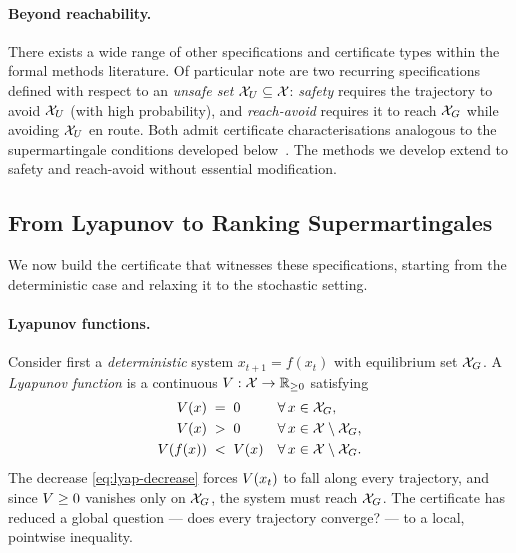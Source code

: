\paragraph{Beyond reachability.} There exists a wide range of other specifications and certificate types
within the formal methods literature. Of particular note are two recurring specifications defined with respect to an \emph{unsafe set} $\mathcal{X}_U \subseteq \mathcal{X}$:
\textit{safety} requires the trajectory to avoid $\mathcal{X}_U$ (with high probability),
and \textit{reach-avoid} requires it to reach $\mathcal{X}_G$ while avoiding $\mathcal{X}_U$ en
route. Both admit certificate characterisations analogous to the supermartingale
conditions developed below~\cite{zikelic2023reachavoid}. The methods we develop extend to safety and
reach-avoid without essential modification.

\subsection{From Lyapunov to Ranking Supermartingales}
\label{subsec:supermartingales}

We now build the certificate that witnesses these specifications, starting from
the deterministic case and relaxing it to the stochastic setting.

\paragraph{Lyapunov functions.} Consider first a \emph{deterministic} system
$x_{t+1} = f(x_t)$ with equilibrium set $\mathcal{X}_G$. A \textit{Lyapunov function} is
a continuous $V : \mathcal{X} \to \mathbb{R}_{\geq 0}$ satisfying
%
\begin{align}
    V(x) \;&=\; 0 && \forall\, x \in \mathcal{X}_G, \label{eq:lyap-zero}\\
    V(x) \;&>\; 0 && \forall\, x \in \mathcal{X} \setminus \mathcal{X}_G, \label{eq:lyap-pos}\\
    V(f(x)) \;&<\; V(x) && \forall\, x \in \mathcal{X} \setminus \mathcal{X}_G. \label{eq:lyap-decrease}
\end{align}
%
The decrease \eqref{eq:lyap-decrease} forces $V(x_t)$ to fall along every
trajectory, and since $V \geq 0$ vanishes only on $\mathcal{X}_G$, the system must
reach $\mathcal{X}_G$. The certificate has reduced a global question --- does every
trajectory converge? --- to a local, pointwise inequality.

